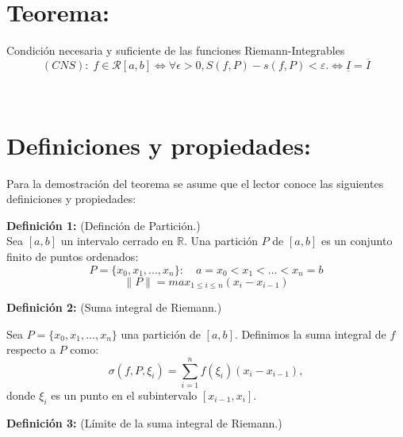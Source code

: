 \documentclass[10pt]{article}
\begin{document}
\section{ Teorema:  }
Condición necesaria y suficiente de las funciones Riemann-Integrables
\begin{equation}
    (CNS): \; f \in \mathcal{R}[a, b] \iff \forall \epsilon > 0,  S(f,P)-s(f,P) < \varepsilon. \iff\underline{I} =\overline{I}
\end{equation}

\\

\section{Definiciones y propiedades:}
Para la demostración del teorema se asume que el lector conoce las siguientes definiciones y propiedades:
\\
\item \textbf{Definición 1:} (Definción de Partición.)
\\
Sea $[a, b]$ un intervalo cerrado en $\mathbb{R}$. Una partición $P$ de $[a, b]$ es un conjunto finito de puntos ordenados: 
				\begin{equation}
					\label{def:partición}
					P = \{x_0, x_1, ..., x_n\}: \quad a = x_0 < x_1 < ... < x_n = b 
				\end{equation}
				\begin{equation}
					\label{def:partMax}
					\|P\| = max_{1\leq i \leq n}(x_i - x_{i-1})
\end{equation}

\item \textbf{Definición 2:} (Suma integral de Riemann.)

Sea $P = \{x_0, x_1, \dots, x_n\}$ una partición de $[a,b]$. Definimos la suma integral de $f$ respecto a $P$ como:
\begin{equation}
    \sigma(f, P,\xi_i) = \sum_{i=1}^{n} f(\xi_i) (x_i - x_{i-1}),
\end{equation}
donde $\xi_i$ es un punto en el subintervalo $[x_{i-1}, x_i]$.
\\


\item \textbf{Definición 3:} (Límite de la suma integral de Riemann.)
\end{document}
